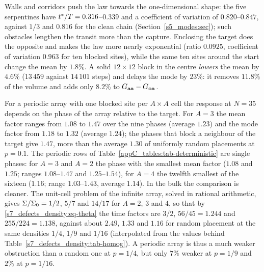 Walls and corridors push the law towards the one-dimensional shape: the five serpentines have
$t^{*}/T=0.316$--$0.339$ and a coefficient of variation of $0.820$--$0.847$, against $1/3$ and $0.816$ for the
clean chain (Section~\ref{s5_modes:sec}); such obstacles lengthen the transit more than the capture.
Enclosing the target does the opposite and makes the law more nearly exponential (ratio $0.0925$, coefficient of
variation $0.963$ for ten blocked sites), while the same ten sites around the start change the mean by $1.8\%$.
A solid $12\times12$ block in the centre \emph{lowers} the mean by $4.6\%$ ($13\,459$ against $14\,101$ steps) and
delays the mode by $23\%$: it removes $11.8\%$ of the volume and adds only $8.2\%$ to
$G_{\mathbf{a}\mathbf{a}}-G_{\mathbf{o}\mathbf{a}}$.

For a periodic array with one blocked site per $A\times A$ cell the response at $N=35$ depends on the phase of
the array relative to the target. For $A=3$ the mean factor ranges from $1.08$ to $1.47$ over the nine phases
(average $1.23$) and the mode factor from $1.18$ to $1.32$ (average $1.24$); the phases that block a neighbour of
the target give $1.47$, more than the average $1.30$ of uniformly random placements at $p=0.1$. The periodic
rows of Table~\ref{appC_tables:tab-deterministic} are single phases: for $A=3$ and $A=2$ the phase with the
smallest mean factor ($1.08$ and $1.25$; ranges $1.08$--$1.47$ and $1.25$--$1.54$), for $A=4$ the twelfth
smallest of the sixteen ($1.16$; range $1.03$--$1.43$, average $1.14$).
In the bulk the comparison is cleaner. The unit-cell problem of the infinite array, solved in rational
arithmetic, gives $\Sigma/\Sigma_{0}=1/2$, $5/7$ and $14/17$ for $A=2$, $3$ and $4$, so that by
\eqref{s7_defects_density:eq-theta} the time factors are $3/2$, $56/45=1.244$ and $255/224=1.138$, against about
$2.49$, $1.33$ and $1.16$ for random placement at the same densities $1/4$, $1/9$ and $1/16$ (interpolated from
the values behind Table~\ref{s7_defects_density:tab-homog}).
A periodic array is thus a much weaker obstruction than a random one at $p=1/4$, but only $7\%$ weaker at
$p=1/9$ and $2\%$ at $p=1/16$.

